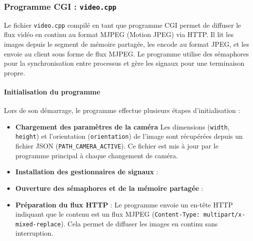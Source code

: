 \documentclass[a4paper, 11pt, french]{article}
\begin{document}
\subsubsection{Programme CGI : \texttt{video.cpp}} \label{sec:video.cgi}


Le fichier \texttt{video.cpp} compilé en tant que programme CGI permet de  diffuser le flux vidéo en continu au format MJPEG (Motion JPEG) via HTTP. Il lit les images depuis le segment de mémoire partagée, les encode au format JPEG, et les envoie au client sous forme de flux MJPEG. Le programme utilise des sémaphores pour la synchronisation entre processus et gère les signaux pour une terminaison propre.


\paragraph{Initialisation du programme}
Lors de son démarrage, le programme effectue plusieurs étapes d'initialisation :
\begin{itemize}
    \item \textbf{Chargement des paramètres de la caméra} Les dimensions (\texttt{width}, \texttt{height}) et l'orientation (\texttt{orientation}) de l'image sont récupérées depuis un fichier JSON (\texttt{PATH\_CAMERA\_ACTIVE}). Ce fichier est mis à jour par le programme principal à chaque changement de caméra.
    \item \textbf{Installation des gestionnaires de signaux} :
    \item \textbf{Ouverture des sémaphores et de la mémoire partagée} :
    \item \textbf{Préparation du flux HTTP} : Le programme envoie un en-tête HTTP indiquant que le contenu est un flux MJPEG (\texttt{Content-Type: multipart/x-mixed-replace}). Cela permet de diffuser les images en continu sans interruption.
\end{itemize}
\end{document}
